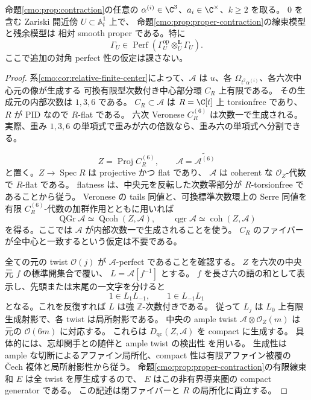 \begin{theorem}
\label{cmo:thm:relative-smoothness}
命題\ref{cmo:prop:contraction}の任意の
$\alpha^{(i)}\in\C^3$、$a_i\in\C^\times$、$k\ge2$ を取る。
$0$ を含む Zariski 開近傍 $U\subset\mathbb A^1_t$ 上で、
命題\ref{cmo:prop:proper-contraction}の線束模型と残余模型は
相対 smooth proper である。特に
\begin{equation}\label{cmo:eq:relative-diagonal}
 \Gamma_U\in\operatorname{Perf}\!\left(
       \Gamma_U^{\mathrm{op}}\otimes_U^{\mathbf L}\Gamma_U\right).
\end{equation}
ここで追加の対角 perfect 性の仮定は課さない。
\end{theorem}
\begin{proof}
系\ref{cmo:cor:relative-finite-center}によって、$\mathscr A$ は
$u$、各 $\Omega_{t^2\alpha^{(i)}}$、各六次中心元の像が生成する
可換有限型次数付き中心部分環 $C_R$ 上有限である。
その生成元の内部次数は $1,3,6$ である。
$C_R\subset\mathscr A$ は $R=\C[t]$ 上 torsionfree であり、
$R$ が PID なので $R$-flat である。
六次 Veronese $C_R^{(6)}$ は次数一で生成される。
実際、重み $1,3,6$ の単項式で重みが六の倍数なら、重み六の単項式へ分割できる。

\[
 Z=\operatorname{Proj}C_R^{(6)},\qquad
 \mathcal A=\widetilde{\mathscr A^{(6)}}
\]
と置く。$Z\to\operatorname{Spec}R$ は projective かつ flat であり、
$\mathcal A$ は coherent な $\mathcal O_Z$-代数で $R$-flat である。
flatness は、中央元を反転した次数零部分が $R$-torsionfree であることから従う。
Veronese の tails 同値と、可換標準次数環上の Serre 同値を
有限 $C_R^{(6)}$-代数の加群作用とともに用いれば
\[
 \operatorname{QGr}\mathscr A\simeq\operatorname{Qcoh}(Z,\mathcal A),\qquad
 \operatorname{qgr}\mathscr A\simeq\operatorname{coh}(Z,\mathcal A)
\]
を得る。ここでは $\mathscr A$ が内部次数一で生成されることを使う。
$C_R$ のファイバーが全中心と一致するという仮定は不要である。

全ての元の twist $\mathcal O(j)$ が $\mathcal A$-perfect であることを確認する。
$Z$ を六次の中央元 $f$ の標準開集合で覆い、
$L=\mathscr A[f^{-1}]$ とする。
$f$ を長さ六の語の和として表示し、先頭または末尾の一文字を分けると
\[
 1\in L_1L_{-1},\qquad 1\in L_{-1}L_1
\]
となる。これを反復すれば $L$ は強 $\mathbb Z$-次数付きである。
従って $L_j$ は $L_0$ 上有限生成射影で、各 twist は局所射影である。
中央の ample twist $\mathcal A\otimes\mathcal O_Z(m)$ は
元の $\mathcal O(6m)$ に対応する。
これらは $D_{\mathrm{qc}}(Z,\mathcal A)$ を compact に生成する。
具体的には、忘却関手との随伴と ample twist の検出性
\cite[Tag~0BQR]{CMOStacksDerived}を用いる。
生成性は ample な切断によるアファイン局所化、compact 性は有限アファイン被覆の
\v Cech 複体と局所射影性から従う。
命題\ref{cmo:prop:proper-contraction}の有限線束和 $E$ は全 twist を厚生成するので、
$E$ はこの非有界導来圏の compact generator である。
この記述は閉ファイバーと $R$ の局所化に両立する。


\end{proof}
